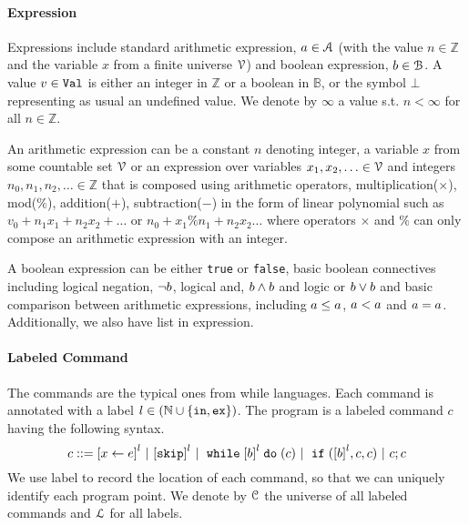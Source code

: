 \paragraph{Expression}
Expressions include
standard arithmetic expression, $a \in \mathcal{A}$ (with the value $n \in \mathbb{Z}$ and the variable $x$ from a finite universe $\mathcal{V}$) and boolean expression, $b \in \mathcal{B}$.
A value $v\in \mathtt{Val}$ is either an integer in $\mathbb{Z}$ or a boolean in $\mathbb{B}$, or the symbol $\bot$ representing as usual an undefined value.
We denote by $\infty$ a value s.t. $n < \infty $ for all $n \in \mathbb{Z}$.

An arithmetic expression can be a constant $n$ denoting integer, a variable $x$ from some countable set $\mathcal{V}$ or an expression over variables $x_1, x_2, \ldots \in \mathcal{V}$
and integers $n_0, n_1, n_2, \ldots \in \mathbb{Z}$ that is composed using arithmetic operators,
multiplication($\times $), mod($\%$), addition($+$), subtraction($-$) in the form of linear polynomial such as $v_0 + n_1 x_1 + n_2 x_2 + \ldots$ or $n_0 + x_1 \% n_1 + n_2 x_2 \ldots$ where operators $\times$ and $\%$ can only compose an arithmetic expression with an integer.

%
A boolean expression can be either {\tt true} or {\tt false}, basic boolean connectives including logical negation,  $\neg b$, logical and, $b \land b$ and logic or
$b \lor b$ and basic comparison between arithmetic expressions, 
including $a \leq a$, $a < a$ and
$a = a$.
Additionally, we also have list in expression.

\paragraph{Labeled Command}
The commands are the typical ones from while languages. Each command is annotated with a label $l \in (\mathbb{N} \cup \{\mathtt{in}, \mathtt{ex}\})$. The program is a labeled command $c$ having the following syntax. 
\[
{c} ::= 
\clabel{\assign{x}{\expr}}^l 
~|~  \clabel{\eskip}^l
~|~ \ewhile \clabel{\bexpr}^{l} \edo ({c})
~|~ \eif(\clabel{\bexpr}^{l} , {c}, {c}) 
~|~ {c};{c} 
\]
We use label to record
the location of each command, so that we can uniquely identify each program point.
We denote by $\mathcal{C}$ the universe of all labeled commands and $\mathcal{L}$ for all labels.

